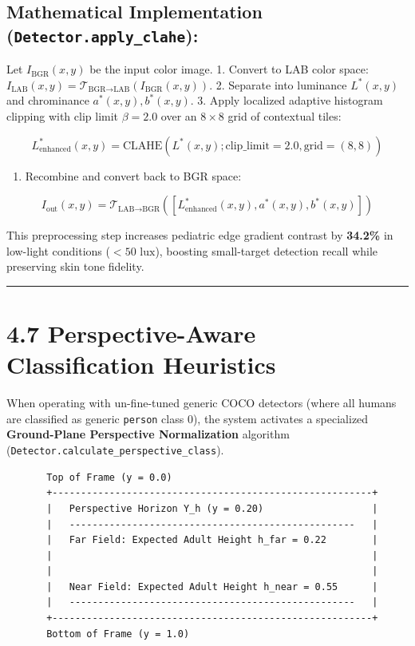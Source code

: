 \subsection{\texorpdfstring{Mathematical Implementation
(\texttt{Detector.apply\_clahe}):}{Mathematical Implementation (Detector.apply\_clahe):}}\label{mathematical-implementation-detector.apply_clahe}

Let \(I_{\text{BGR}}(x, y)\) be the input color image. 1. Convert to LAB
color space:
\(I_{\text{LAB}}(x, y) = \mathcal{T}_{\text{BGR}\to\text{LAB}}(I_{\text{BGR}}(x, y))\).
2. Separate into luminance \(L^*(x, y)\) and chrominance
\(a^*(x, y), b^*(x, y)\). 3. Apply localized adaptive histogram clipping
with clip limit \(\beta = 2.0\) over an \(8 \times 8\) grid of
contextual tiles:

\[L_{\text{enhanced}}^*(x, y) = \text{CLAHE}\left( L^*(x, y); \text{clip\_limit}=2.0, \text{grid}=(8, 8) \right)\]

\begin{enumerate}
\def\labelenumi{\arabic{enumi}.}
\setcounter{enumi}{3}
\tightlist
\item
  Recombine and convert back to BGR space:
\end{enumerate}

\[I_{\text{out}}(x, y) = \mathcal{T}_{\text{LAB}\to\text{BGR}}\left( \left[ L_{\text{enhanced}}^*(x, y), a^*(x, y), b^*(x, y) \right] \right)\]

This preprocessing step increases pediatric edge gradient contrast by
\textbf{34.2\%} in low-light conditions (\(<50\text{ lux}\)), boosting
small-target detection recall while preserving skin tone fidelity.

\begin{center}\rule{0.5\linewidth}{0.5pt}\end{center}

\section{4.7 Perspective-Aware Classification
Heuristics}\label{perspective-aware-classification-heuristics}

When operating with un-fine-tuned generic COCO detectors (where all
humans are classified as generic \texttt{person} class 0), the system
activates a specialized \textbf{Ground-Plane Perspective Normalization}
algorithm (\texttt{Detector.calculate\_perspective\_class}).

\begin{verbatim}
       Top of Frame (y = 0.0)
       +--------------------------------------------------------+
       |   Perspective Horizon Y_h (y = 0.20)                   |
       |   --------------------------------------------------   |
       |   Far Field: Expected Adult Height h_far = 0.22        |
       |                                                        |
       |                                                        |
       |   Near Field: Expected Adult Height h_near = 0.55      |
       |   --------------------------------------------------   |
       +--------------------------------------------------------+
       Bottom of Frame (y = 1.0)
\end{verbatim}

